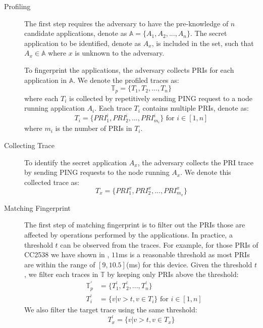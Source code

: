 \begin{description}
	\item[Profiling]
	The first step requires the adversary to have the pre-knowledge of $n$ candidate applications, denote as $\mathbb{A} = \{A_1, A_2, ..., A_n\}$. The secret application to be identified, denote as $A_x$, is included in the set, such that $A_x \in \mathbb{A}$ where $x$ is unknown to the adversary.
	
	To fingerprint the applications, the adversary collects PRIs for each application in $\mathbb{A}$. We denote the profiled traces as:
	\begin{equation}
		\mathbb{T}_p = \{T_1, T_2, ..., T_n\}
	\end{equation}
where each $T_i$ is collected by repetitively sending PING request to a node running application $A_i$. Each trace $T_i$ contains multiple PRIs, denote as:
	\begin{equation}
		T_i = \{PRI^i_1, PRI^i_2, ..., PRI^i_{m_i}\} \text{ for } i \in [1,n]
	\end{equation}
	where $m_i$ is the number of PRIs in $T_i$.

	\item[Collecting Trace]
	To identify the secret application $A_x$, the adversary collects the PRI trace by sending PING requests to the node running $A_x$. We denote this collected trace as:
	\begin{equation}
		T_x = \{ PRI^x_1, PRI^x_2, ..., PRI^x_{m_x}\} %
	\end{equation}
	
	\item[Matching Fingerprint]
	The first step of matching fingerprint is to filter out the PRIs those are affected by operations performed by the applications. In practice, a threshold $t$ can be observed from the traces. For example, for those PRIs of CC2538 we have shown in , $11$ms is a reasonable threshold as most PRIs are within the range of $[9,10.5]$(ms) for this device.
	Given the threshold $t$, we filter each traces in $\mathbb{T}$ by keeping only PRIs above the threshold:
	\begin{eqnarray}
		&\mathbb{T}^{\prime}_{p} &= \{ T^{\prime}_1, T^{\prime}_2, ..., T^{\prime}_n\} \\
		&T^{\prime}_{i} &= \{v | v > t, v \in T_i\} \text{ for } i \in [1,n]
	\end{eqnarray}
	We also filter the target trace using the same threshold:
	\begin{equation}
		T^{\prime}_x =  \{v | v > t, v \in T_x\}
	\end{equation}
	

\end{description}
